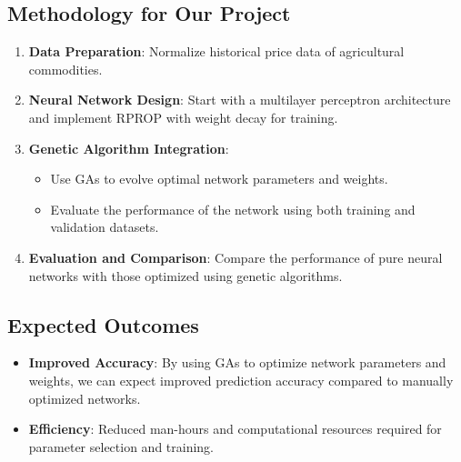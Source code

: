 \documentclass[12pt]{article}
\begin{document}
\subsection{Methodology for Our Project}
\begin{enumerate}
    \item \textbf{Data Preparation}: Normalize historical price data of agricultural commodities.
    \item \textbf{Neural Network Design}: Start with a multilayer perceptron architecture and implement RPROP with weight decay for training.
    \item \textbf{Genetic Algorithm Integration}:
    \begin{itemize}
        \item Use GAs to evolve optimal network parameters and weights.
        \item Evaluate the performance of the network using both training and validation datasets.
    \end{itemize}
    \item \textbf{Evaluation and Comparison}: Compare the performance of pure neural networks with those optimized using genetic algorithms.
\end{enumerate}

\subsection{Expected Outcomes}
\begin{itemize}
    \item \textbf{Improved Accuracy}: By using GAs to optimize network parameters and weights, we can expect improved prediction accuracy compared to manually optimized networks.
    \item \textbf{Efficiency}: Reduced man-hours and computational resources required for parameter selection and training.
\end{itemize}
\end{document}
